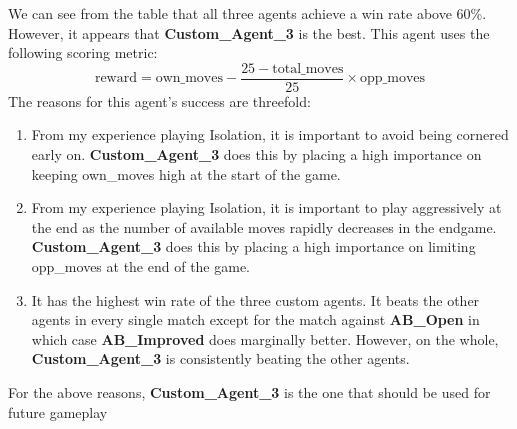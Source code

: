 \documentclass[10pt]{article}
\begin{document}
\newpage

We can see from the table that all three agents achieve a win rate above 60\%. However, it appears that \textbf{Custom\_Agent\_3} is the best. This agent uses the following scoring metric:
\begin{equation}
\textrm{reward} = \textrm{own\_moves} - \frac{25 - \textrm{total\_moves}}{25} \times \textrm{opp\_moves}
\end{equation}
The reasons for this agent's success are threefold:
\begin{enumerate}
\item  From my experience playing Isolation, it is important to avoid being cornered early on. \textbf{Custom\_Agent\_3} does this by placing a high importance on keeping own\_moves high at the start of the game.
\item From my experience playing Isolation, it is important to play aggressively at the end as the number of available moves rapidly decreases in the endgame. \textbf{Custom\_Agent\_3} does this by placing a high importance on limiting opp\_moves at the end of the game.
\item It has the highest win rate of the three custom agents. It beats the other agents in every single match except for the match against \textbf{AB\_Open} in which case \textbf{AB\_Improved} does marginally better. However, on the whole, \textbf{Custom\_Agent\_3} is consistently beating the other agents.
\end{enumerate}
For the above reasons, \textbf{Custom\_Agent\_3} is the one that should be used for future gameplay
\end{document}
